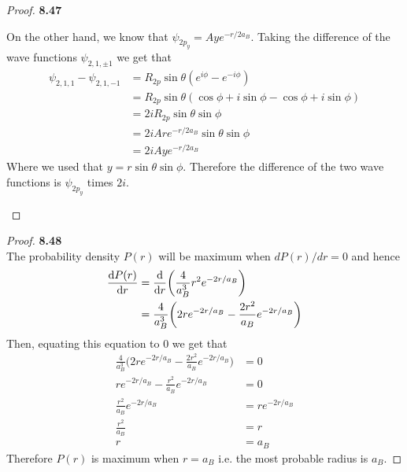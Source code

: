 \documentclass[11pt]{article}
\theoremstyle{definition}
\begin{document}
\begin{proof}{\textbf{8.47}}
\begin{itemize}
On the other hand, we know that $\psi_{2p_y} = Aye^{-r/2a_B}$.
Taking the difference of the wave functions $\psi_{2,1,\pm 1}$ we get that
\begin{align*}
\psi_{2,1,1} - \psi_{2,1,-1}
    &= R_{2p}\sin\theta(e^{i\phi} - e^{-i\phi})\\
    &= R_{2p}\sin\theta(\cos\phi + i\sin\phi - \cos\phi + i\sin\phi)\\
    &= 2iR_{2p}\sin\theta\sin\phi\\
    &= 2iAre^{-r/2a_B}\sin\theta\sin\phi\\
    &= 2iAye^{-r/2a_B}
\end{align*}
Where we used that $y = r\sin\theta\sin\phi$. Therefore the difference of the
two wave functions is $\psi_{2p_y}$ times $2i$.
\end{itemize}
\end{proof}

\cleardoublepage
\begin{proof}{\textbf{8.48}}\\
The probability density $P(r)$ will be maximum when $dP(r)/dr = 0$ and hence
\begin{align*}
    \dv{P(r)}{r} &= \dv{r}(\frac{4}{a_B^3}r^2 e^{-2r/a_B})\\
    &= \frac{4}{a_B^3}\bigg(2r e^{-2r/a_B} - \frac{2r^2}{a_B} e^{-2r/a_B}\bigg)
\end{align*}
Then, equating this equation to 0 we get that
\begin{align*}
    \frac{4}{a_B^3}\bigg(2r e^{-2r/a_B} - \frac{2r^2}{a_B} e^{-2r/a_B}\bigg)
    &= 0\\
    r e^{-2r/a_B} - \frac{r^2}{a_B} e^{-2r/a_B} &= 0\\
    \frac{r^2}{a_B} e^{-2r/a_B} &= r e^{-2r/a_B}\\
    \frac{r^2}{a_B} &= r\\
    r &= a_B
\end{align*}
Therefore $P(r)$ is maximum when $r = a_B$ i.e. the most probable radius is
$a_B$.
\end{proof}
\end{document}
